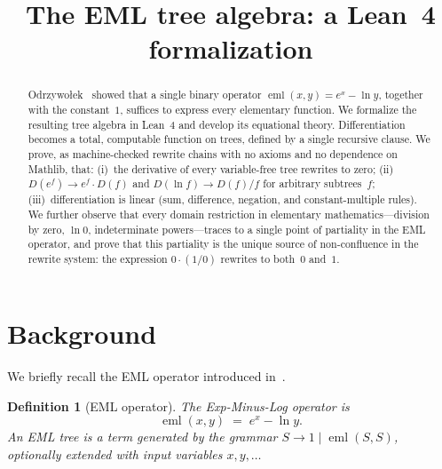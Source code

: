 \documentclass[11pt]{article}
\title{The EML tree algebra: a Lean~4 formalization}
\author{}
\date{}
\newtheorem{definition}[theorem]{Definition}
\begin{document}
\maketitle

\begin{abstract}
Odrzywołek~\cite{odrzywolek2026} showed that a single binary operator
$\operatorname{eml}(x,y) = e^x - \ln y$, together with the constant~$1$,
suffices to express every elementary function.
We formalize the resulting tree algebra in Lean~4 and develop its
equational theory.
Differentiation becomes a total, computable function on trees, defined
by a single recursive clause.
We prove, as machine-checked rewrite chains with no axioms and no
dependence on Mathlib, that:
(i)~the derivative of every variable-free tree rewrites to zero;
(ii)~$D(e^f) \to e^f \cdot D(f)$ and $D(\ln f) \to D(f)/f$ for
arbitrary subtrees~$f$;
(iii)~differentiation is linear (sum, difference, negation, and
constant-multiple rules).
We further observe that every domain restriction in elementary
mathematics---division by zero, $\ln 0$, indeterminate
powers---traces to a single point of partiality in the EML operator,
and prove that this partiality is the unique source of non-confluence
in the rewrite system: the expression $0 \cdot (1/0)$ rewrites to
both~$0$ and~$1$.
\end{abstract}

\section{Background}

We briefly recall the EML operator introduced in~\cite{odrzywolek2026}.

\begin{definition}[EML operator]
The \emph{Exp-Minus-Log} operator is
\begin{equation}\label{eq:eml}
  \operatorname{eml}(x,y) \;=\; e^{x} - \ln y.
\end{equation}
An \emph{EML tree} is a term generated by the grammar
$S \to 1 \mid \operatorname{eml}(S,S)$,
optionally extended with input variables $x, y, \ldots$
\end{definition}
\end{document}
